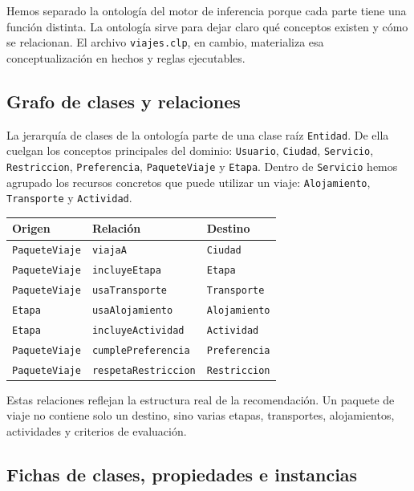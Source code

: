 \documentclass[11pt,a4paper]{article}
\begin{document}
Hemos separado la ontolog\'ia del motor de inferencia porque cada parte tiene
una funci\'on distinta. La ontolog\'ia sirve para dejar claro qu\'e conceptos
existen y c\'omo se relacionan. El archivo \texttt{viajes.clp}, en cambio,
materializa esa conceptualizaci\'on en hechos y reglas ejecutables.

\subsection{Grafo de clases y relaciones}
La jerarqu\'ia de clases de la ontolog\'ia parte de una clase ra\'iz
\texttt{Entidad}. De ella cuelgan los conceptos principales del dominio:
\texttt{Usuario}, \texttt{Ciudad}, \texttt{Servicio}, \texttt{Restriccion},
\texttt{Preferencia}, \texttt{PaqueteViaje} y \texttt{Etapa}. Dentro de
\texttt{Servicio} hemos agrupado los recursos concretos que puede utilizar un
viaje: \texttt{Alojamiento}, \texttt{Transporte} y \texttt{Actividad}.

\begin{center}
\begin{tabular}{p{} p{} p{}}
Origen & Relaci\'on & Destino \\
\hline
\texttt{PaqueteViaje} & \texttt{viajaA} & \texttt{Ciudad} \\
\texttt{PaqueteViaje} & \texttt{incluyeEtapa} & \texttt{Etapa} \\
\texttt{PaqueteViaje} & \texttt{usaTransporte} & \texttt{Transporte} \\
\texttt{Etapa} & \texttt{usaAlojamiento} & \texttt{Alojamiento} \\
\texttt{Etapa} & \texttt{incluyeActividad} & \texttt{Actividad} \\
\texttt{PaqueteViaje} & \texttt{cumplePreferencia} & \texttt{Preferencia} \\
\texttt{PaqueteViaje} & \texttt{respetaRestriccion} & \texttt{Restriccion} \\
\end{tabular}
\end{center}

Estas relaciones reflejan la estructura real de la recomendaci\'on. Un paquete
de viaje no contiene solo un destino, sino varias etapas, transportes,
alojamientos, actividades y criterios de evaluaci\'on.

\subsection{Fichas de clases, propiedades e instancias}
\end{document}

